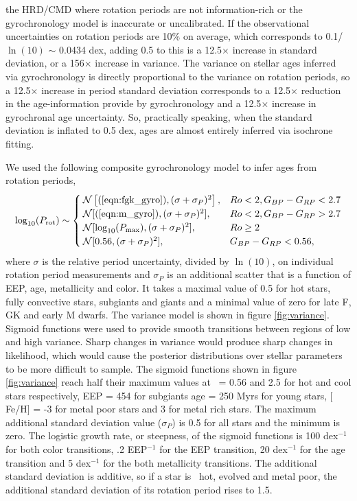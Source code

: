 {the HRD/CMD where rotation periods are not information-rich or the
gyrochronology model is inaccurate or uncalibrated.
If the observational uncertainties on rotation periods are 10\% on average,
which corresponds to 0.1/$\ln(10)$ $\sim$ 0.0434 dex, adding 0.5 to this is
a 12.5$\times$ increase in standard deviation, or a 156$\times$ increase in
variance.
The variance on stellar ages inferred via gyrochronology is directly
proportional to the variance on rotation periods, so a 12.5$\times$ increase
in period standard deviation corresponds to a 12.5$\times$ reduction in the
age-information provide by gyrochronology and a 12.5$\times$ increase in
gyrochronal age uncertainty.
So, practically speaking, when the standard deviation is inflated to 0.5 dex,
ages are almost entirely inferred via isochrone fitting.
}

We used the following composite gyrochronology model to infer ages from
rotation periods,
\begin{equation}
    \log_{10}(P_\mathrm{rot}) \sim \begin{cases}
        \mathcal{N}\left[(\ref{eqn:fgk_gyro}), (\sigma+\sigma_P)^2\right], & Ro < 2,
        G_{BP} - G_{RP} < 2.7 \\
        \mathcal{N}[(\ref{eqn:m_gyro}), (\sigma+\sigma_P)^2], & Ro < 2,
        G_{BP} - G_{RP} > 2.7 \\
        \mathcal{N}[\log_{10}(P_\mathrm{max}), (\sigma+\sigma_P)^2],& Ro \geq 2 \\
        \mathcal{N}[0.56, (\sigma+\sigma_P)^2],& G_{BP} - G_{RP} < 0.56,
    \end{cases}
\label{eqn:gyro}
\end{equation}
where $\sigma$ is the relative period uncertainty, divided by $\ln(10)$, on
individual rotation period measurements and $\sigma_P$ is an additional
scatter that is a function of EEP, age, metallicity and color.
It takes a maximal value of 0.5 for hot stars, fully convective stars,
subgiants and giants and a minimal value of zero for late F, GK and early M
dwarfs.
The variance model is shown in figure \ref{fig:variance}.
Sigmoid functions were used to provide smooth transitions between regions of
low and high variance.
Sharp changes in variance would produce sharp changes in likelihood, which
would cause the posterior distributions over stellar parameters to be more
difficult to sample.
The sigmoid functions shown in figure \ref{fig:variance} reach half their
maximum values at \gcolor\ = 0.56 and 2.5 for hot and cool stars respectively,
EEP = 454 for subgiants age = 250 Myrs for young stars, $[$Fe/H$]$ = -3 for
metal poor stars and 3 for metal rich stars.
The maximum additional standard deviation value ($\sigma_P$) is 0.5 for all
stars and the minimum is zero.
The logistic growth rate, or steepness, of the sigmoid functions is 100
dex$^{-1}$ for both color transitions, .2 EEP$^{-1}$ for the EEP transition,
20 dex$^{-1}$ for the age transition and 5 dex$^{-1}$ for the both metallicity
transitions.
The additional standard deviation is additive, so if a star is \eg\ hot,
evolved and metal poor, the additional standard deviation of its rotation
period rises to 1.5.

